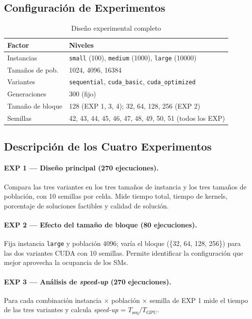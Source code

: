 \subsection{Configuración de Experimentos}

\begin{table}[H]
  \centering
  \caption{Diseño experimental completo}
  \label{tab:diseno}
  \begin{tabular}{ll}
    \toprule
    \textbf{Factor} & \textbf{Niveles} \\
    \midrule
    Instancias       & \texttt{small} (100), \texttt{medium} (1000), \texttt{large} (10000) \\
    Tamaños de pob.  & 1024, 4096, 16384 \\
    Variantes        & \texttt{sequential}, \texttt{cuda\_basic}, \texttt{cuda\_optimized} \\
    Generaciones     & 300 (fijo) \\
    Tamaño de bloque & 128 (EXP 1, 3, 4); 32, 64, 128, 256 (EXP 2)\\
    Semillas         & 42, 43, 44, 45, 46, 47, 48, 49, 50, 51 (todos los EXP) \\
    \bottomrule
  \end{tabular}
\end{table}

\subsection{Descripción de los Cuatro Experimentos}

\paragraph{EXP 1 — Diseño principal (270 ejecuciones).}
Compara las tres variantes en los tres tamaños de instancia y los tres tamaños de
población, con 10 semillas por celda. Mide tiempo total, tiempo de kernels,
porcentaje de soluciones factibles y calidad de solución.

\paragraph{EXP 2 — Efecto del tamaño de bloque (80 ejecuciones).}
Fija instancia \texttt{large} y población 4096; varía el bloque
(\{32, 64, 128, 256\}) para las dos variantes CUDA con 10 semillas. Permite
identificar la configuración que mejor aprovecha la ocupancia de los SMs.

\paragraph{EXP 3 — Análisis de \emph{speed-up} (270 ejecuciones).}
Para cada combinación instancia × población × semilla de EXP 1
mide el tiempo de las tres variantes y calcula \emph{speed-up} =
$T_{\text{seq}} / T_{\text{GPU}}$.


